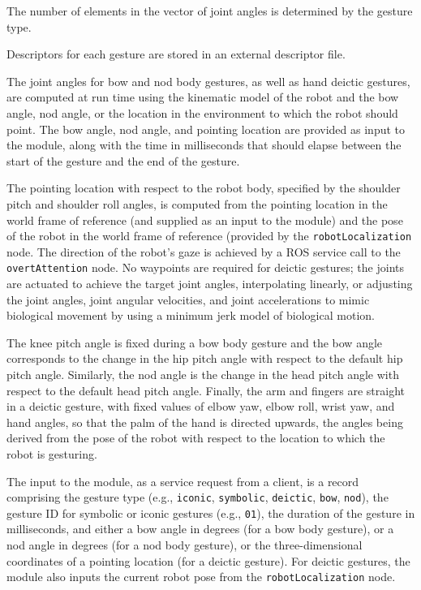 \documentclass{CSSRforAfrica}
\begin{document}
The number of elements in the vector of joint angles is determined by the gesture type.

Descriptors for each gesture are stored in an external descriptor file.

The joint angles for bow and nod body gestures, as well as hand deictic gestures, are computed at run time using the kinematic model of the robot and the bow angle, nod angle, or the location in the environment to which the robot should point. The bow angle, nod angle, and pointing location are provided as input to the module, along with the time in milliseconds that should elapse between the start of the gesture and the end of the gesture.

The pointing location with respect to the robot body, specified by the shoulder pitch and shoulder roll angles, is computed from the pointing location in the world frame of reference (and supplied as an input to the module) and the pose of the robot in the world frame of reference (provided by the \texttt{robotLocalization} node.  The direction of the robot's gaze is achieved by a ROS service call to the \texttt{overtAttention} node. No waypoints are required for deictic gestures; the joints are actuated to achieve the target joint angles, interpolating linearly, or adjusting the joint angles, joint angular velocities, and joint accelerations to mimic biological movement by using a minimum jerk model of biological motion.

The knee pitch angle is fixed during a bow body gesture and the bow angle corresponds to the change in the hip pitch angle with respect to the default hip pitch angle. Similarly, the nod angle is the change in the head pitch angle with respect to the default head pitch angle. Finally,  the arm and fingers are straight in a deictic gesture, with fixed values of elbow yaw, elbow roll, wrist yaw, and hand angles, so that the palm of the hand is directed upwards, the angles being derived from the pose of the robot with respect to the location to which the robot is gesturing.

The input to the module, as a service request from a client,  is a record comprising the gesture type (e.g., \texttt{iconic}, \texttt{symbolic}, \texttt{deictic}, \texttt{bow}, \texttt{nod}), the gesture ID for symbolic or iconic gestures (e.g., \texttt{01}), the duration of the gesture in milliseconds, and either a bow angle in degrees (for a bow body gesture), or a nod angle in degrees (for a nod body gesture), or the three-dimensional coordinates of a pointing location (for a deictic gesture). For deictic gestures, the module also inputs the current robot pose from the \texttt{robotLocalization} node.
\end{document}
